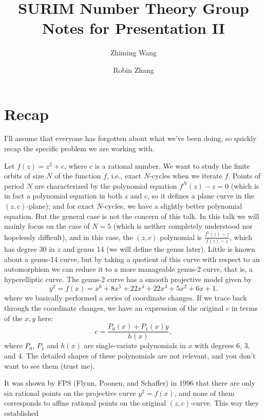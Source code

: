 

\title{SURIM Number Theory Group\\Notes for Presentation II}

\author{Zhiming Wang}
\author{Robin Zhang}



\maketitle

\section{Recap}

I'll assume that everyone has forgotten about what we've been doing,
so quickly recap the specific problem we are working with.

Let $f(z) = z^2 + c$, where $c$ is a rational number. We want to study
the finite orbits of size $N$ of the function $f$, i.e., exact
$N$-cycles when we iterate $f$. Points of period $N$ are characterized
by the polynomial equation $f^N(z) - z = 0$ (which is in fact a
polynomial equation in both $z$ and $c$, so it defines a plane curve
in the $(z, c)$-plane); and for exact $N$-cycles, we have a slightly
better polynomial equation. But the general case is not the concern of
this talk. In this talk we will mainly focus on the case of $N = 5$
(which is neither completely understood nor hopelessly difficult), and
in this case, the $(z, c)$ polynomial is $\frac{f^5(z) - z}{f(z) -
  z}$, which has degree 30 in $z$ and genus 14 (we will define the
genus later). Little is known about a genus-14 curve, but by taking a
quotient of this curve with respect to an automorphism we can reduce
it to a more manageable genus-2 curve, that is, a hyperelliptic
curve. The genus-2 curve has a smooth projective model given by
\[
y^2 = f(x) = x^6 + 8x^5 + 22x^4 + 22x^3 + 5x^2 + 6x + 1.
\]
where we basically performed a series of coordinate changes. If we
trace back through the coordinate changes, we have an expression of
the original $c$ in terms of the $x, y$ here:
\[
c = \frac{P_0(x) + P_1(x) y}{h(x)},
\]
where $P_0$, $P_1$ and $h(x)$ are single-variate polynomials in $x$
with degrees 6, 3, and 4. The detailed shapes of these polynomials are
not relevant, and you don't want to see them (trust me).

It was shown by FPS (Flynn, Poonen, and Schaffer) in 1996 that there
are only six rational points on the projective curve $y^2 = f(x)$, and
none of them corresponds to affine rational points on the original
$(z, c)$-curve. This way they established

